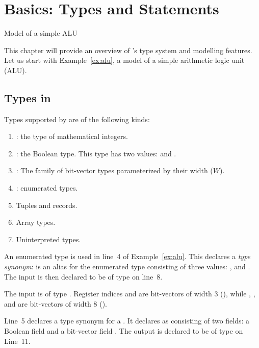 \chapter{Basics: Types and Statements}
\begin{uclidlisting}[htbp]
    
    \caption{Model of a simple ALU}
\label{ex:alu}
\end{uclidlisting}

This chapter will provide an overview of \uclid{}'s type system and modelling features. Let us start with Example~\ref{ex:alu}, a model of a simple arithmetic logic unit (ALU). 

\section{Types in \uclid{}}

Types supported by \uclid{} are of the following kinds: 
\begin{enumerate}
    \item {}: the type of mathematical integers.
    \item {}: the Boolean type. This type has two values:  and .
    \item {}: The family of bit-vector types parameterized by their width ($W$).
    \item {}: enumerated types.
    \item Tuples and records.
    \item Array types.
    \item Uninterpreted types.
\end{enumerate}

An enumerated type is used in line~4 of Example~\ref{ex:alu}. This declares a \textit{type synonym}:  is an alias for the enumerated type consisting of three values: ,  and . The input  is then declared to be of type  on line~8. 

The input  is of type . Register indices  and  are bit-vectors of width 3 (), while , ,  and  are bit-vectors of width 8 ().

Line~5 declares a type synonym for a . It declares  as consisting of two fields: a Boolean field  and a bit-vector field . The output  is declared to be of type  on Line~11.

